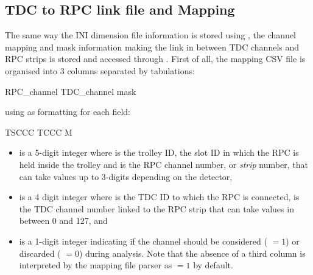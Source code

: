 	\subsection{TDC to RPC link file and Mapping}
	\label{app2:ssec:mapping}
	
	The same way the INI dimension file information is stored using , the channel mapping and mask information making the link in between TDC channels and RPC strips is stored and accessed through . First of all, the mapping CSV file is organised into 3 columns separated by tabulations:\\
	
	\begin{textcode}
 RPC_channel	TDC_channel	mask
	\end{textcode}
	\vspace{5mm}
	
	using as formatting for each field:\\
	
	\begin{textcode}
 TSCCC	TCCC	M
	\end{textcode}
	
	\begin{itemize}
		\item[\textinline{TSCCC}] is a 5-digit integer where  is the trolley ID,  the slot ID in which the RPC is held inside the trolley  and  is the RPC channel number, or \textit{strip} number, that can take values up to 3-digits depending on the detector,
		\item[\textinline{TCCC}] is a 4 digit integer where  is the TDC ID to which the RPC is connected,  is the TDC channel number linked to the RPC strip that can take values in between 0 and 127, and
		\item[\textinline{M}] is a 1-digit integer indicating if the channel should be considered ( $=1$) or discarded ( $=0$) during analysis. Note that the absence of a third column is interpreted by the mapping file parser as  $=1$ by default.
	\end{itemize}
	
